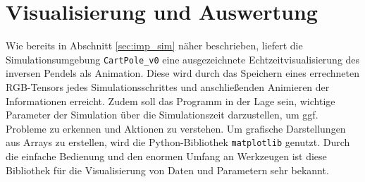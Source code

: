 \section{Visualisierung und Auswertung}
\label{sec:imp_vis}
	Wie bereits in Abschnitt \ref{sec:imp_sim} näher beschrieben, liefert die Simulationsumgebung \texttt{CartPole\_v0} eine ausgezeichnete Echtzeitvisualisierung des inversen Pendels als Animation. Diese wird durch das Speichern eines errechneten RGB-Tensors jedes Simulationsschrittes und anschließenden Animieren der Informationen erreicht. Zudem soll das Programm in der Lage sein, wichtige Parameter der Simulation über die Simulationszeit darzustellen, um ggf. Probleme zu erkennen und Aktionen zu verstehen. Um grafische Darstellungen aus Arrays zu erstellen, wird die Python-Bibliothek \texttt{matplotlib} \cite{Hunter2007} genutzt. Durch die einfache Bedienung und den enormen Umfang an Werkzeugen ist diese Bibliothek für die Visualisierung von Daten und Parametern sehr bekannt.
	
